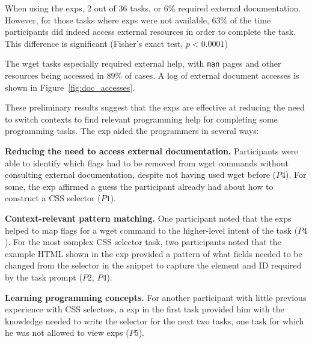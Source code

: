 \begin{changes}
When using the \glspl{exp}, 2 out of 36 tasks, or 6\% required external documentation.
However, for those tasks where \glspl{exp} were not available, 63\% of the time participants did indeed access external resources in order to complete the task.
This difference is significant (Fisher's exact test, $p < 0.0001$)
\end{changes}
The wget tasks especially required external help, with \texttt{man} pages and other resources being accessed in 89\% of cases.  
A log of external document accesses is shown in Figure~\ref{fig:doc_accesses}. 





These preliminary results suggest that the \glspl{exp} are effective at reducing the need to switch contexts to find relevant programming help  for completing some programming tasks. 
The \gls{exp} aided the programmers in several ways:

{\bf Reducing the need to access external documentation.}
Participants were  able to identify which flags had to be removed from wget commands without consulting external documentation, despite not having used wget before ($P4$).
For some, the \gls{exp} affirmed a guess the participant already had about how to construct a CSS selector ($P1$).

{\bf Context-relevant pattern matching.}
One participant noted that the \glspl{exp} helped  to map flags for a wget command to the higher-level intent of the task ($P4$). 
For the most complex CSS selector task, two participants noted
that the example HTML shown in the \gls{exp} 
provided a pattern of what fields needed to be changed  from the selector in the snippet to capture the element and ID required by the task prompt ($P2$, $P4$).

{\bf Learning programming concepts.}
For another participant with little previous experience with CSS selectors, a \gls{exp} in  the first task provided him with the knowledge needed to write the selector for the next two tasks, one task for which he was not allowed to view \glspl{exp} ($P5$).

